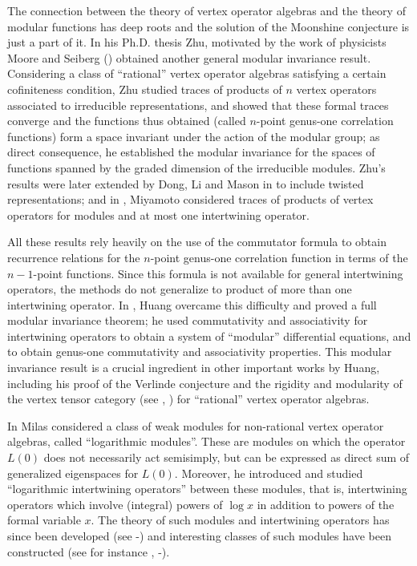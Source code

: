 \documentclass[12pt]{article}
\begin{document}
The connection between the theory of vertex operator algebras and
the theory of modular functions has deep roots and the solution of the
Moonshine conjecture is just a part of it.
In his Ph.D. thesis \cite{Z} Zhu, motivated by the work of physicists Moore
and Seiberg (\cite{MS1, MS2}) obtained another general modular invariance
result. Considering a class of ``rational'' vertex operator algebras satisfying
a certain cofiniteness condition, Zhu studied traces of products of $n$ vertex
operators associated to irreducible representations, and showed that these formal
traces converge and the functions thus obtained (called $n$-point genus-one
correlation functions) form a space invariant under the action of the modular
group; as direct consequence, he established the modular invariance for the
spaces of functions spanned by the graded dimension of the irreducible modules.
Zhu's results were later extended by Dong, Li and Mason in \cite{DLM2}
to include twisted representations; and in \cite{Miy1}, Miyamoto 
considered traces of products of vertex operators for modules and at most one
intertwining operator.

All these results rely heavily on the use of the commutator formula
to obtain recurrence relations for the $n$-point genus-one correlation
function in terms of the $n-1$-point functions. Since this formula
is not available for general intertwining operators, the methods do not 
generalize to product of more than one intertwining operator. In
\cite{H2}, Huang overcame this difficulty and proved a full modular
invariance theorem; he used commutativity and associativity
for intertwining operators to obtain a system of ``modular''
differential equations, and to obtain genus-one commutativity and
associativity properties.
This modular invariance result is a crucial ingredient in other important
works by Huang, including his proof of the Verlinde conjecture and the rigidity
and modularity of the vertex tensor category (see \cite{H4}, \cite{H5})
for ``rational'' vertex operator algebras.


In \cite{M1} Milas considered a class of weak modules for non-rational
vertex operator algebras, called ``logarithmic modules''. These are modules
on which the operator $L(0)$ does not necessarily act semisimply, but can
be expressed as direct sum of generalized eigenspaces for $L(0)$. Moreover,
he introduced and studied ``logarithmic intertwining operators'' between
these modules, that is, intertwining operators which involve (integral)
powers of $\log x$ in addition to powers of the formal variable $x$.
The theory of such modules and intertwining operators has
since been developed (see \cite{HLZ1}-\cite{HLZ8}) and interesting
classes of such modules have been constructed (see for instance
\cite{M2}, \cite{AM1}-\cite{AM3}).
\end{document}
